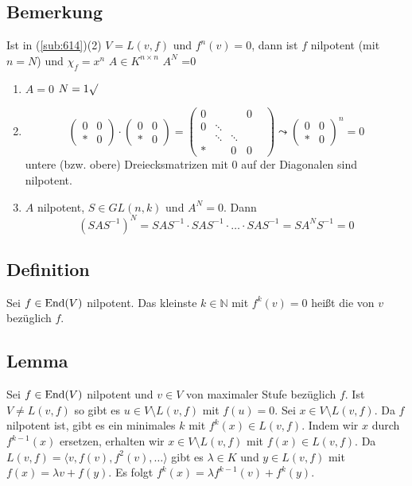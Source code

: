 \subsection[Bemerkung: Folgerung über Nilpotenz aus \ref{sub:614}]{Bemerkung} %
\label{sub:616}
Ist in (\ref{sub:614})(2) $V=L(v,f)$ und $f^n(v)=0$, dann ist $f$ nilpotent (mit $n=N$) und $\chi_f = x^n$
$A \in K^{n \times n}$ $A^N$ =0
\begin{enumerate}[(1)]
	\item $A=0$ $N=1 \surd$
	\item \[
		\begin{pmatrix}
			0 & 0 \\
			* & 0
		\end{pmatrix} \cdot  \begin{pmatrix}
			0 & 0 \\
			* & 0
		\end{pmatrix} = \begin{pmatrix}
			0 & & & 0 \\
			0 & \ddots & & \\ 
			& \ddots & \ddots & & \\
			* & & 0 & 0
		\end{pmatrix} \leadsto \begin{pmatrix}
			0 & 0 \\
			* & 0
		\end{pmatrix}^n = 0
	\] 
	untere (bzw. obere) Dreiecksmatrizen mit $0$ auf der Diagonalen sind nilpotent.
	\item $A$ nilpotent, $S \in GL(n,k)$ und $A^N=0$. Dann 
	\[
		(SAS ^{-1})^N = SAS ^{-1} \cdot  SAS ^{-1} \cdot \ldots \cdot  SAS ^{-1} = S A^N S ^{-1} = 0
	\]
\end{enumerate}

\subsection[Definition: Stufe]{Definition} %
\label{sub:617}
Sei $f \in \operatorname{End}(V)$ nilpotent. Das kleinste $k \in \mathds{N}$ mit $f^k (v) = 0$ heißt die  von $v$ bezüglich $f$. 

\subsection[Lemma über ein $v$ maximaler Stufe]{Lemma} %
\label{sub:618}
Sei $f \in \operatorname{End}(V)$ nilpotent und $v \in V$ von maximaler Stufe bezüglich $f$. Ist $V \not= L(v,f)$ so gibt es $u \in V \setminus L(v,f)$ mit $f(u)=0$.
Sei $x \in V \setminus L(v,f)$. Da $f$ nilpotent ist, gibt es ein minimales $k$ mit $f^k (x) \in L(v,f)$. Indem wir $x$ durch $f^{k-1}(x)$ ersetzen, erhalten wir 
$x \in V \setminus L(v,f)$ mit $f(x) \in L(v,f).$ Da $L(v,f)= \langle v, f(v), f^2(v), \ldots \rangle$ gibt es $\lambda \in K$ und $y \in L(v,f)$ mit 
$f(x)=\lambda v + f(y)$. Es folgt $f^k(x)= \lambda f^{k-1}(v) + f^k(y)$. 

